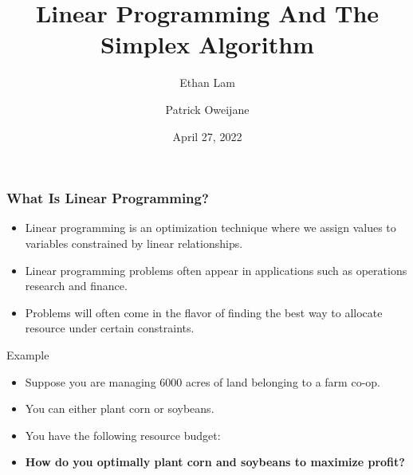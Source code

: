 \documentclass{beamer}
\title{Linear Programming And The Simplex Algorithm}
\author{Ethan Lam \and Patrick Oweijane}
\institute{Christian Brothers University}
\date{April 27, 2022}
\begin{document}
\frame{\titlepage}

\begin{frame}
\frametitle{What Is Linear Programming?}
\begin{itemize}
    \item<1-> Linear programming is an optimization technique where we assign values to variables constrained by linear relationships.
    \item<2-> Linear programming problems often appear in applications such as operations research and finance.
    \item<2-> Problems will often come in the flavor of finding the best way to allocate resource under certain constraints.
\end{itemize}
\end{frame}

\begin{frame}{Example}
    \begin{itemize}
        \item<1-> Suppose you are managing 6000 acres of land belonging to a farm co-op.
        \item<2-> You can either plant corn or soybeans.
        \item<3-> You have the following resource budget: 
        \item<4-> \textbf{How do you optimally plant corn and soybeans to maximize profit?}
    \end{itemize}
\end{frame}
\end{document}
